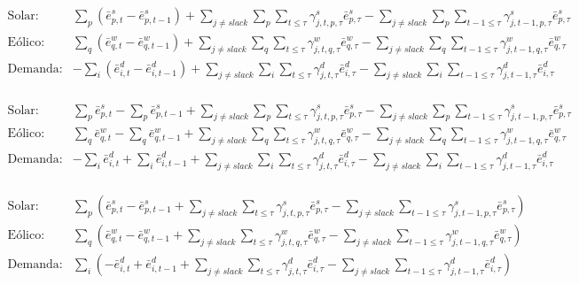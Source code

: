 \begin{align*}
    \text{Solar:} & \sum_{p} \left ( \bar{e}^{s}_{p,t} - \bar{e}^{s}_{p,t-1} \right ) + \sum_{j\neq{slack}}\sum_{p} \sum_{t \leqslant  \tau}\gamma^{s}_{j, t, p, \tau}\bar{e}^{s}_{p,\tau} - \sum_{j\neq{slack}}\sum_{p} \sum_{t-1 \leqslant  \tau}\gamma^{s}_{j, t-1, p, \tau}\bar{e}^{s}_{p,\tau}  \\
    \text{Eólico:} &  \sum_{q} \left ( \bar{e}^{w}_{q,t} - \bar{e}^{w}_{q,t-1} \right) + \sum_{j\neq{slack}}\sum_{q} \sum_{t \leqslant  \tau}\gamma^{w}_{j, t, q, \tau} \bar{e}^{w}_{q,\tau} - \sum_{j\neq{slack}}\sum_{q} \sum_{t-1 \leqslant  \tau}\gamma^{w}_{j, t-1, q, \tau} \bar{e}^{w}_{q,\tau} \\
    \text{Demanda:} & - \sum_{i} \left ( \bar{e}^{d}_{i, t} - \bar{e}^{d}_{i, t-1} \right ) + \sum_{j\neq{slack}}\sum_{i} \sum_{t \leqslant  \tau}\gamma^{d}_{j, t,\tau}\bar{e}^{d}_{i,\tau} - \sum_{j\neq{slack}}\sum_{i} \sum_{t-1 \leqslant  \tau}\gamma^{d}_{j, t-1,\tau}\bar{e}^{d}_{i,\tau} \\
\end{align*}

\begin{align*}
    \text{Solar:} & \sum_{p} \bar{e}^{s}_{p,t} - \sum_{p}\bar{e}^{s}_{p,t-1} + \sum_{j\neq{slack}}\sum_{p} \sum_{t \leqslant  \tau}\gamma^{s}_{j, t, p, \tau}\bar{e}^{s}_{p,\tau} - \sum_{j\neq{slack}}\sum_{p} \sum_{t-1 \leqslant  \tau}\gamma^{s}_{j, t-1, p, \tau}\bar{e}^{s}_{p,\tau}  \\
    \text{Eólico:} & \sum_{q} \bar{e}^{w}_{q,t} - \sum_{q}\bar{e}^{w}_{q,t-1} + \sum_{j\neq{slack}}\sum_{q} \sum_{t \leqslant  \tau}\gamma^{w}_{j, t, q, \tau} \bar{e}^{w}_{q,\tau} - \sum_{j\neq{slack}}\sum_{q} \sum_{t-1 \leqslant  \tau}\gamma^{w}_{j, t-1, q, \tau} \bar{e}^{w}_{q,\tau} \\
    \text{Demanda:} & - \sum_{i} \bar{e}^{d}_{i, t} + \sum_{i} \bar{e}^{d}_{i, t-1} + \sum_{j\neq{slack}}\sum_{i} \sum_{t \leqslant  \tau}\gamma^{d}_{j, t,\tau}\bar{e}^{d}_{i,\tau} - \sum_{j\neq{slack}}\sum_{i} \sum_{t-1 \leqslant  \tau}\gamma^{d}_{j, t-1,\tau}\bar{e}^{d}_{i,\tau} \\
\end{align*}

\begin{align*}
    \text{Solar:} & \sum_{p} \left ( \bar{e}^{s}_{p,t} - \bar{e}^{s}_{p,t-1} + \sum_{j\neq{slack}}\sum_{t \leqslant  \tau}\gamma^{s}_{j, t, p, \tau}\bar{e}^{s}_{p,\tau} - \sum_{j\neq{slack}}\sum_{t-1 \leqslant  \tau}\gamma^{s}_{j, t-1, p, \tau}\bar{e}^{s}_{p,\tau} \right )  \\
    \text{Eólico:} & \sum_{q} \left ( \bar{e}^{w}_{q,t} - \bar{e}^{w}_{q,t-1} + \sum_{j\neq{slack}}\sum_{t \leqslant  \tau}\gamma^{w}_{j, t, q, \tau} \bar{e}^{w}_{q,\tau} - \sum_{j\neq{slack}}\sum_{t-1 \leqslant \tau}\gamma^{w}_{j, t-1, q, \tau} \bar{e}^{w}_{q,\tau} \right )\\
    \text{Demanda:} & \sum_{i} \left ( - \bar{e}^{d}_{i, t} + \bar{e}^{d}_{i, t-1} + \sum_{j\neq{slack}}\sum_{t \leqslant  \tau}\gamma^{d}_{j, t,\tau}\bar{e}^{d}_{i,\tau} - \sum_{j\neq{slack}}\sum_{t-1 \leqslant  \tau}\gamma^{d}_{j, t-1,\tau}\bar{e}^{d}_{i,\tau} \right ) \\
\end{align*}

